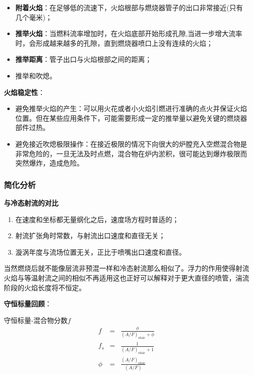 \begin{multicols}{2}
    \tiny
    \begin{itemize}
        \item \textbf{附着火焰}：在足够低的流速下，火焰根部与燃烧器管子的出口非常接近(只有几个毫米)；
        \item \textbf{推举火焰}：当燃料流率增加时，在火焰底部开始形成孔隙,当进一步增大流率时，会形成越来越多的孔隙，直到燃烧器喷口上没有连续的火焰；
        \item \textbf{推举距离}：管子出口与火焰根部之间的距离；
        \item 推举和吹熄。
    \end{itemize}
    
    \textbf{火焰稳定性}：
    \begin{itemize}
        \item 避免推举火焰的产生：可以用火花或者小火焰引燃进行准确的点火并保证火焰位置。但在某些应用条件下，可能需要形成一定的推举量以避免关键的燃烧器部件过热。
        \item 避免接近吹熄极限操作：在接近极限的情况下向很大的炉膛充入空燃混合物是非常危险的，一旦无法及时点燃，混合物在炉内淤积，很可能达到爆炸极限而突然爆炸，造成危险。
    \end{itemize}
\end{multicols}

\subsubsection{简化分析}
\textbf{与冷态射流的对比}
\begin{enumerate}
    \item 在速度和坐标都无量纲化之后，速度场方程时普适的；
    \item 射流扩张角时常数，与射流出口速度和直径无关；
    \item 漩涡年度与流场位置无关，正比于喷嘴出口速度和直径。
\end{enumerate}

当然燃烧后就不能像层流非预混一样和冷态射流那么相似了。浮力的作用使得射流火焰与等温射流之间的相似不再适用这也正好可以解释对于更大直径的喷管，湍流阶段的火焰长度将不恒定。

\textbf{守恒标量回顾}：

守恒标量-混合物分数\(f\)
\begin{eqnarray}
    f &=& \frac{\phi}{(A/F)_\mathrm{stoic}+\phi} \\
    f_s &=& \frac{1}{(A/F)_\mathrm{stoic}+1} \\
    \phi &=& \frac{(A/F)_\mathrm{stoic}}{(A/F)}
\end{eqnarray}

